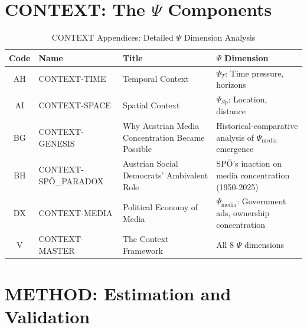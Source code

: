 \section{CONTEXT: The $\Psi$ Components}
\label{sec:index-context}

\begin{table}[htbp]
\centering
\caption{CONTEXT Appendices: Detailed $\Psi$ Dimension Analysis}
\label{tab:index-context}
\renewcommand{\arraystretch}{1.4}
\begin{tabular}{@{}clll@{}}
\toprule
\textbf{Code} & \textbf{Name} & \textbf{Title} & \textbf{$\Psi$ Dimension} \\
\midrule
AH & CONTEXT-TIME & Temporal Context & $\Psi_T$: Time pressure, horizons \\
AI & CONTEXT-SPACE & Spatial Context & $\Psi_{Sp}$: Location, distance \\
BG & CONTEXT-GENESIS & Why Austrian Media Concentration Became Possible & Historical-comparative analysis of $\Psi_{\text{media}}$ emergence \\
BH & CONTEXT-SPÖ_PARADOX & Austrian Social Democrats' Ambivalent Role & SPÖ's inaction on media concentration (1950-2025) \\
DX & CONTEXT-MEDIA & Political Economy of Media & $\Psi_{\text{media}}$: Government ads, ownership concentration \\
V & CONTEXT-MASTER & The Context Framework & All 8 $\Psi$ dimensions \\
\bottomrule
\end{tabular}
\end{table}

\section{METHOD: Estimation and Validation}
\label{sec:index-method}

